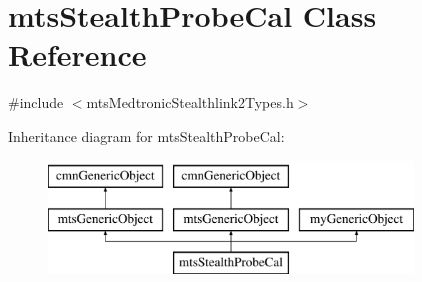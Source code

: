 \hypertarget{classmts_stealth_probe_cal}{\section{mts\-Stealth\-Probe\-Cal Class Reference}
\label{classmts_stealth_probe_cal}
}


{\ttfamily \#include $<$mts\-Medtronic\-Stealthlink2\-Types.\-h$>$}

Inheritance diagram for mts\-Stealth\-Probe\-Cal\-:\begin{figure}[H]
\begin{center}
\leavevmode
\includegraphics[height=3.000000cm]{d2/dd0/classmts_stealth_probe_cal}
\end{center}
\end{figure}
